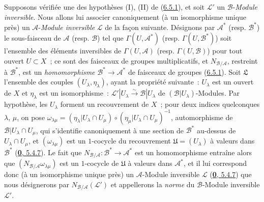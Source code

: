 \begin{env}[6.5.2]
\label{II.6.5.2-fr}
Supposons vérifiée une des hypothèses (I), (II) de
(\hyperref[II.6.5.1-fr]{6.5.1}), et soit $\mathcal{L}'$ un
$\mathcal{B}$-\emph{Module inversible}. Nous allons lui associer canoniquement
(à un isomorphisme unique près) un $\mathcal{A}$-\emph{Module inversible}
$\mathcal{L}$ de la façon suivante. Désignons par $\mathcal{A}^*$ (resp.
$\mathcal{B}^*$) le sous-faisceau de $\mathcal{A}$ (resp. $\mathcal{B}$) tel
que $\Gamma(U,\mathcal{A}^*)$ (resp. $\Gamma(U,\mathcal{B}^*)$) soit
l'ensemble des
éléments inversibles de $\Gamma(U,\mathcal{A})$ (resp.
$\Gamma(U,\mathcal{B})$) pour tout ouvert $U\subset X$~; ce sont des faisceaux
de groupes multiplicatifs, et $N_{\mathcal{B}/\mathcal{A}}$, restreint à
$\mathcal{B}^*$, est un \emph{homomorphisme}
$\mathcal{B}^*\to\mathcal{A}^*$ de faisceaux de groupes
(\hyperref[II.6.5.1-fr]{6.5.1}). Soit $\mathfrak{L}$ l'ensemble des couples
$(U_\lambda,\eta_\lambda)$, ayant la propriété suivante~: $U_\lambda$ est un
ouvert de $X$ et $\eta_\lambda$ est un isomorphisme~:
$\mathcal{L}'|U_\lambda\xrightarrow{\sim}\mathcal{B}|U_\lambda$ de
$(\mathcal{B}|U_\lambda)$-Modules. Par hypothèse, les $U_\lambda$ forment un
recouvrement de $X$~; pour deux indices quelconques $\lambda$, $\mu$, on pose
$\omega_{\lambda\mu}=(\eta_\lambda|U_\lambda\cap U_\mu)
\circ(\eta_\mu|U_\lambda\cap U_\mu)^{-1}$, automorphisme de
$\mathcal{B}|U_\lambda\cap U_\mu$, qui s'identifie canoniquement à une section
de $\mathcal{B}^*$ au-dessus de $U_\lambda\cap U_\mu$, et
$(\omega_{\lambda\mu})$ est un $1$-cocycle du recouvrement
$\mathfrak{U}=(U_\lambda)$ à valeurs dans $\mathcal{B}^*$
(\hyperref[0.5.4.7-fr]{\textbf{0}, 5.4.7}). Le fait que
$N_{\mathcal{B}/\mathcal{A}}:\mathcal{B}^*\to\mathcal{A}^*$ est un
homomorphisme entraîne alors que
$(N_{\mathcal{B}/\mathcal{A}}\omega_{\lambda\mu})$ est un $1$-cocycle de
$\mathfrak{U}$ à valeurs dans $\mathcal{A}^*$, et il lui correspond donc (à un
isomorphisme unique près) un $\mathcal{A}$-Module inversible $\mathcal{L}$
(\hyperref[0.5.4.7-fr]{\textbf{0}, 5.4.7}) que nous désignerons par
$N_{\mathcal{B}/\mathcal{A}}(\mathcal{L}')$ et appellerons la \emph{norme} du
$\mathcal{B}$-Module inversible $\mathcal{L}'$.


\end{env}
